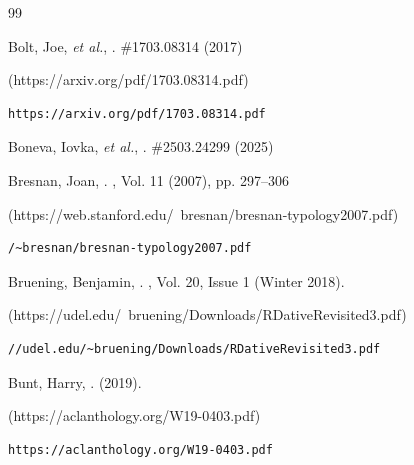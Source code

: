 \begin{thebibliography}{99}
{\begin{bItem}[Bolt]
Bolt, Joe, \textit{et al.},
.
 \#1703.08314 (2017)
%
\begin{boxurl}(https://arxiv.org/pdf/1703.08314.pdf)
\begin{lstlisting}
https://arxiv.org/pdf/1703.08314.pdf
\end{lstlisting}
\end{boxurl}\end{bItem}


\begin{bItem}[IovkaBoneva]
Boneva, Iovka, \textit{et al.}, 
.
 \#2503.24299 (2025)
%
\end{bItem}



\begin{bItem}[JoanBresnan]
Bresnan, Joan,  
.
,
Vol. 11 (2007), pp. 297--306 
%
\begin{boxurl}(https://web.stanford.edu/~bresnan/bresnan-typology2007.pdf)
\begin{lstlisting}
/~bresnan/bresnan-typology2007.pdf
\end{lstlisting}
\end{boxurl}\end{bItem}




\begin{bItem}[Bruening]
Bruening, Benjamin,  
.
, 
Vol. 20, Issue 1 (Winter 2018). 
%
\begin{boxurl}(https://udel.edu/~bruening/Downloads/RDativeRevisited3.pdf)
\begin{lstlisting}
//udel.edu/~bruening/Downloads/RDativeRevisited3.pdf
\end{lstlisting}
\end{boxurl}\end{bItem}



\begin{bItem}[HarryBunt]
Bunt, Harry,  
.
(2019).
%
\begin{boxurl}(https://aclanthology.org/W19-0403.pdf)
\begin{lstlisting}
https://aclanthology.org/W19-0403.pdf
\end{lstlisting}
\end{boxurl}\end{bItem}





}
\end{thebibliography}
